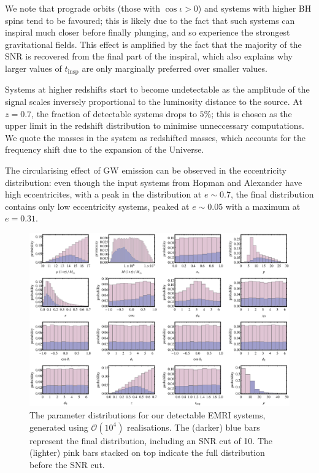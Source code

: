 \documentclass[aps,prd,amsfonts,amssymb,amsmath,nofootinbib,showpacs,superscriptaddress,twocolumn]{revtex4}
\begin{document}
We note that prograde orbits (those with $\cos\iota > 0$) and systems with higher BH spins tend to be favoured; this is likely due to the fact that such systems can inspiral much closer before finally plunging, and so experience the strongest gravitational fields. This effect is amplified by the fact that the majority of the SNR is recovered from the final part of the inspiral, which also explains why larger values of $t_\mathrm{insp}$ are only marginally preferred over smaller values.

Systems at higher redshifts start to become undetectable as the amplitude of the signal scales inversely proportional to the luminosity distance to the source. At $z=0.7$, the fraction of detectable systems drops to $5\%$; this is chosen as the upper limit in the redshift distribution to minimise unneccessary computations. We quote the masses in the system as redshifted masses, which accounts for the frequency shift due to the expansion of the Universe.

The circularising effect of GW emission can be observed in the eccentricity distribution: even though the input systems from Hopman and Alexander have high eccentricites, with a peak in the distribution at $e\sim0.7$, the final distribution contains only low eccentricity systems, peaked at $e\sim0.05$ with a maximum at $e=0.31$.

\begin{figure}[htbp]
\centering
\includegraphics[width=\textwidth]{Fig_EMRIpar_dists}
\caption{\label{fig:EMRIpar-dists}The parameter distributions for our detectable EMRI systems, generated using $\mathcal{O}(10^4)$ realisations. The (darker) blue bars represent the final distribution, including an SNR cut of 10. The (lighter) pink bars stacked on top indicate the full distribution before the SNR cut.}
\end{figure}
\end{document}
